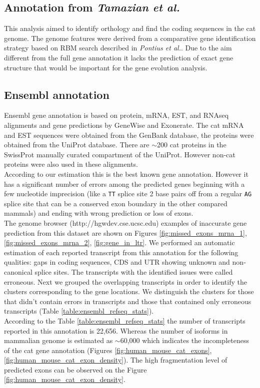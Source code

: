 \documentclass{article}
\begin{document}
\subsection{Annotation from \textit{Tamazian et al.}}
This analysis aimed to identify orthology and find the coding sequences in the cat genome.
The genome features were derived from a comparative gene identification strategy based on RBM search described in \textit{Pontius et al.}.
Due to the aim different from the full gene annotation it lacks the prediction of exact gene structure that would be important for the gene evolution analysis. 

\subsection{Ensembl annotation}
Ensembl gene annotation is based on protein, mRNA, EST, and RNAseq alignments and gene predictions by GeneWise and Exonerate. The cat mRNA and EST sequences were obtained from the GenBank database, the proteins were obtained from the UniProt database. There are $\sim$200 cat proteins in the SwissProt manually curated compartment of the UniProt. However non-cat proteins  were also used in these alignments.\\
According to our estimation this is the best known gene annotation. 
However it has a significant number of errors among the predicted genes beginning with a few nucleotide imprecision (like a \texttt{TT} splice site 2 base pairs off from a regular \texttt{AG} splice site that can be a conserved exon boundary in the other compared mammals) and ending with wrong prediction or loss of exons.\\
The genome browser (http://hgwdev.cse.ucsc.edu) examples of inaccurate gene prediction from this dataset are shown on Figures \ref{fig:missed_exons_mrna_1}, \ref{fig:missed_exons_mrna_2}, \ref{fig:gene_in_ltr}.
We performed an automatic estimation of each reported transcript from this annotation for the following qualities: gaps in coding sequences, CDS and UTR showing unknown and non-canonical splice sites. The transcripts with the identified issues were called erroneous. Next we grouped the overlapping transcripts in order to identify the clusters corresponding to the gene locations. We distinguish the clusters for those that didn’t contain errors in transcripts and those that contained only erroneous transcripts (Table \ref{table:ensembl_refseq_stats}). \\
According to the Table \ref{table:ensembl_refseq_stats} the number of transcripts reported in this annotation is 22{,}656. Whereas the  number of isoforms in mammalian genome is estimated as $\sim$60{,}000 which indicates the incompleteness of the cat gene annotation (Figures \ref{fig:human_mouse_cat_exons}, \ref{fig:human_mouse_cat_exon_density}). The high fragmentation level of predicted exons can be observed on the Figure \ref{fig:human_mouse_cat_exon_density}.
\end{document}
